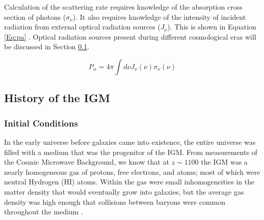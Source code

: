 Calculation of the scattering rate requires knowledge of the absorption cross section of photons ($\sigma_{\nu}$). It also requires knowledge of the intensity of incident radiation from external optical radiation sources ($J_{\nu}$). This is shown in Equation \ref{Eq:pa} \cite{furlanetto_2006}. Optical radiation sources present during different cosmological eras will be discussed in Section \ref{Sec:IGMhist}. 

\begin{equation}\label{Eq:pa}
P_{\alpha} = 4 \pi \int d\nu J_{\nu}(\nu) \sigma_{\nu}(\nu)
\end{equation}


\subsection{History of the IGM} \label{Sec:IGMhist}

\subsubsection{Initial Conditions}

In the early universe before galaxies came into existence, the entire universe was filled with a medium that was the progenitor of the IGM. From measurements of the Cosmic Microwave Background, we know that at $z \sim 1100$ the IGM was a nearly homogeneous gas of protons, free electrons, and atoms; most of which were neutral Hydrogen (HI) atoms. Within the gas were small inhomogeneities in the matter density that would eventually grow into galaxies, but the average gas density was high enough that collisions between baryons were common throughout the medium \cite{furlanetto_2006}. 

